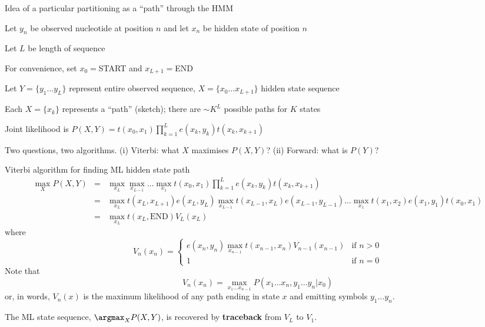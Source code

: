 \documentclass{beamer}
\begin{document}
\begin{frame}{}
\itemb
\item Idea of a particular partitioning as a ``path'' through the HMM
 \itemb
 \item Let $y_n$ be observed nucleotide at position $n$ and let $x_n$ be hidden state of position $n$
  \itemb
  \item Let $L$ be length of sequence
  \item For convenience, set $x_0=$START and $x_{L+1}=$END
  \item Let $Y=\{y_1 \ldots y_L\}$ represent entire observed sequence, $X=\{x_0 \ldots x_{L+1}\}$ hidden state sequence
  \item Each $X=\{x_k\}$ represents a ``path'' (sketch); there are $\sim K^L$ possible paths for $K$ states
  \iteme
 \item Joint likelihood is $P(X,Y) = t(x_0,x_1) \prod_{k=1}^L e(x_k,y_k) t(x_k,x_{k+1})$
 \iteme
\item Two questions, two algorithms. (i) Viterbi: what $X$ maximises $P(X,Y)$? (ii) Forward: what is $P(Y)$?
\iteme
\end{frame}

\begin{frame}{}
\tiny
Viterbi algorithm for finding ML hidden state path
\begin{eqnarray*}
\max_X P(X,Y) & = & \max_{x_L} \max_{x_{L-1}} \ldots \max_{x_1} t(x_0,x_1) \prod_{k=1}^L e(x_k,y_k) t(x_k,x_{k+1}) \\
& = & \max_{x_L} t(x_L,x_{L+1}) e(x_L,y_L) \max_{x_{L-1}} t(x_{L-1},x_L) e(x_{L-1},y_{L-1}) \ldots \max_{x_1} t(x_1,x_2) e(x_1,y_1) t(x_0,x_1) \\
& = & \max_{x_L} t(x_L,\mbox{END}) V_L(x_L)
\end{eqnarray*}
where
\[
V_n(x_n) = \left\{ \begin{array}{ll} \displaystyle
e(x_n,y_n) \max_{x_{n-1}} t(x_{n-1},x_n) V_{n-1}(x_{n-1}) & \mbox{if $n > 0$} \\
1 & \mbox{if $n=0$}
\end{array} \right.
\]
Note that
\[
V_n(x_n) = \max_{x_1 \ldots x_{n-1}} P(x_1 \ldots x_n, y_1 \ldots y_n | x_0)
\]
or, in words, $V_n(x)$ is the maximum likelihood of any path ending in state $x$ and emitting symbols $y_1 \ldots y_n$.

The ML state sequence, $\argmax_X P(X,Y)$, is recovered by {\bf traceback} from $V_L$ to $V_1$.
\end{frame}
\end{document}
